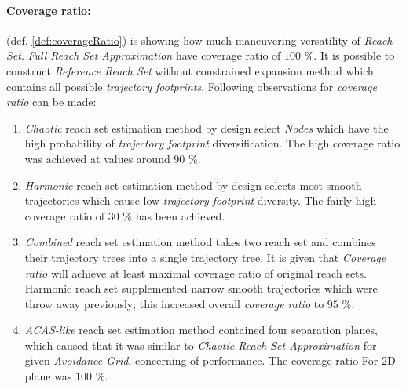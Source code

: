 \paragraph{Coverage ratio:} (def. \ref{def:coverageRatio}) is showing how much maneuvering versatility of \emph{Reach Set}. \emph{Full Reach Set Approximation} have coverage ratio of $100$ $\%$. It is possible to construct \emph{Reference Reach Set} without constrained expansion method which contains all possible \emph{trajectory footprints}. Following observations for \emph{coverage ratio} can be made:
\begin{enumerate}
    \item \emph{Chaotic} reach set estimation method by design select \emph{Nodes} which have the high probability of \emph{trajectory footprint} diversification. The high coverage ratio was achieved at values around 90 $\%$.
    
    \item \emph{Harmonic} reach set estimation method by design selects most smooth trajectories which cause low \emph{trajectory footprint} diversity. The fairly high coverage ratio of $30$ $\%$ has been achieved.
    
    \item \emph{Combined} reach set estimation method takes two reach set and combines their trajectory trees into a single trajectory tree. It is given that \emph{Coverage ratio} will achieve at least maximal coverage ratio of original reach sets. Harmonic reach set supplemented narrow smooth trajectories which were throw away previously; this increased overall \emph{coverage ratio} to $95$ $\%$. 
    
    \item \emph{ACAS-like} reach set estimation method contained four separation planes, which caused that it was similar to \emph{Chaotic Reach Set Approximation} for given \emph{Avoidance Grid}, concerning of performance. The coverage ratio For 2D plane was $100$ $\%$.
\end{enumerate}

